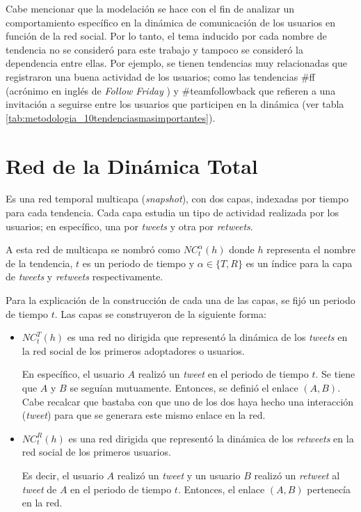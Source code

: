 \documentclass[../main.tex]{subfiles}
\begin{document}
Cabe mencionar que la modelación se hace con el fin de analizar un comportamiento específico en la dinámica de comunicación de los usuarios en función de la red social. Por lo tanto, el tema inducido por cada nombre de tendencia no se consideró para este trabajo y tampoco se consideró la dependencia entre ellas. Por ejemplo, se tienen tendencias muy relacionadas que registraron una buena actividad de los usuarios; como las tendencias \#ff (acrónimo en inglés de \textit{Follow Friday} ) y \#teamfollowback que refieren a una invitación a seguirse entre los usuarios que participen en la dinámica (ver tabla \ref{tab:metodologia_10tendenciasmasimportantes}). 


\section{Red de la Dinámica Total}

Es una red temporal multicapa (\textit{snapshot}), con dos capas, indexadas por tiempo para cada tendencia. Cada capa estudia un tipo de actividad realizada por los usuarios; en específico, una por \textit{tweets} y otra por \textit{retweets}.  

A esta red de multicapa se nombró como $NC^{\alpha}_{t} (h) $ donde $h$ representa el nombre de la tendencia, $t$ es un periodo de tiempo y $\alpha \in \{T, R\}$ es un índice para la capa de \textit{tweets} y \textit{retweets} respectivamente. 


Para la explicación de la construcción de cada una de las capas, se fijó un periodo de tiempo $t$. 
Las capas se construyeron de la siguiente forma:

\begin{itemize}
    \item $NC^{T}_{t}(h)$ es una red no dirigida que representó la dinámica de los \textit{tweets} en la red social de los primeros adoptadores o usuarios. 
    
    En específico, el usuario $A$ realizó un \textit{tweet} en el periodo de tiempo $t$. Se tiene que $A$ y $B$ se seguían mutuamente. Entonces, se definió el enlace $(A,B)$. Cabe recalcar que bastaba con que uno de los dos haya hecho una interacción (\textit{tweet}) para que se generara este mismo enlace en la red.
    
    \item $NC^{R}_{t}(h)$ es una red dirigida que representó la dinámica de los \textit{retweets} en la red social de los primeros usuarios.
    
    Es decir, el usuario $A$ realizó un \textit{tweet} y  un usuario $B$ realizó un \textit{retweet} al \textit{tweet} de $A$ en el periodo de tiempo $t$. Entonces, el enlace $(A,B)$ pertenecía en la red. 
\end{itemize}
\end{document}
